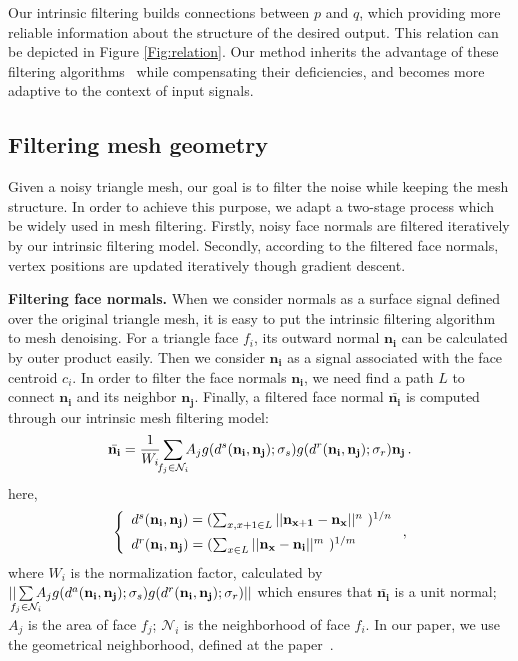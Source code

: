 Our intrinsic filtering builds connections between $p$ and $q$, which providing more reliable information about the structure of the desired output.
This relation can be depicted in Figure \ref{Fig:relation}.
Our method inherits the advantage of these filtering algorithms~\cite{tomasi1998bilateral, grazzini2009edge, Chang2015propagated} while compensating their deficiencies,
and becomes more adaptive to the context of input signals.


\subsection{Filtering mesh geometry}

Given a noisy triangle mesh, our goal is to filter the noise while keeping the mesh structure.
In order to achieve this purpose, we adapt a two-stage process which be widely used in mesh filtering.
Firstly, noisy face normals are filtered iteratively by our intrinsic filtering model. %
Secondly, according to the filtered face normals, vertex positions are updated iteratively though gradient descent.

{\bfseries Filtering face normals.}
When we consider normals as a surface signal defined over the original triangle mesh, it is easy to put the intrinsic filtering algorithm to mesh denoising.
For a triangle face $f_{i}$, its outward normal $\mathbf{n_{i}}$ can be calculated by outer product easily.
Then we consider $\mathbf{n_{i}}$ as a signal associated with the face centroid $c_{i}$.
In order to filter the face normals $\mathbf{n_{i}}$, we need find a path $L$ to connect $\mathbf{n_{i}}$ and its neighbor $\mathbf{n_{j}}$.
Finally, a filtered face normal $\bar{\mathbf{n_{i}}}$ is computed through our intrinsic mesh filtering model:
 \begin{equation}
 \label{Eq:IntrinsicMeshFiltering}
 \bar{\mathbf{n_{i}}} = \frac{1}{W_{i}}\sum_{\mathclap{f_{j}\in\mathcal{N}_{i}}}A_{j}g(d^{s}(\mathbf{n_{i}}, \mathbf{n_{j}}); \sigma_{s})g(d^{r}(\mathbf{n_{i}}, \mathbf{n_{j}}); \sigma_{r})\mathbf{n_{j}}\, .
 \end{equation}
  here,
 \begin{equation}
 \label{eq:IntrinsicMeshDistance}
 \left \{
 \begin{array}{ll}
        d^{s}(\mathbf{n_{i}}, \mathbf{n_{j}}) = (\sum_{x, x+1\in{L}}||\mathbf{n_{x+1}}-\mathbf{n_{x}}||^{n}\,\,)^{1/n} \vspace{1.5mm} \\
        d^{r}(\mathbf{n_{i}}, \mathbf{n_{j}}) = (\sum_{x\in{L}}||\mathbf{n_{x}}-\mathbf{n_{i}}||^{m}\,\,)^{1/m} \\
 \end{array}
 \right. ,
 \end{equation}
where $W_{i}$ is the normalization factor,
calculated by
$||\sum\limits_{\mathclap{f_{j}\in\mathcal{N}_{i}}}A_{j}g(d^{a}(\mathbf{n_{i}}, \mathbf{n_{j}}); \sigma_{s})g(d^{r}(\mathbf{n_{i}}, \mathbf{n_{j}}); \sigma_{r})||$
which ensures that $\bar{\mathbf{n_{i}}}$ is a unit normal;
$A_j$ is the area of face $f_j$;
$\mathcal{N}_{i}$ is the neighborhood of face $f_{i}$.
In our paper, we use the geometrical neighborhood, defined at the paper~\cite{Zhang2015Filter}.

